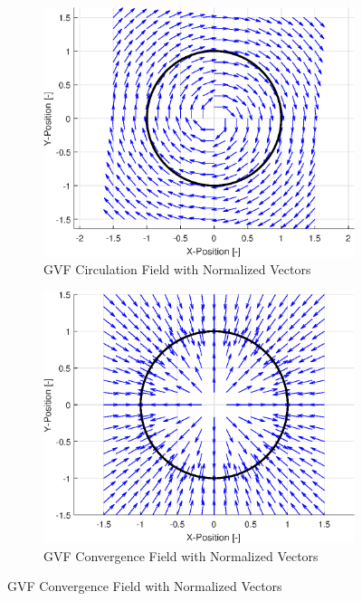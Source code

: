 \documentclass[conf]{new-aiaa}
\begin{document}
\begin{figure}[H]
	\centering
	\begin{subfigure}[t]{0.49\textwidth}
		\centering
		\includegraphics[width=\linewidth]{Circ}
		\caption{GVF Circulation Field with Normalized Vectors}
		\label{fig:circ}
	\end{subfigure}
	\hfill
	\begin{subfigure}[t]{0.49\textwidth}
		\centering
		\includegraphics[width=\linewidth]{Conv}
		\caption{GVF Convergence Field with Normalized Vectors}
		\label{fig:conv}
	\end{subfigure}

\end{figure}
\end{document}
